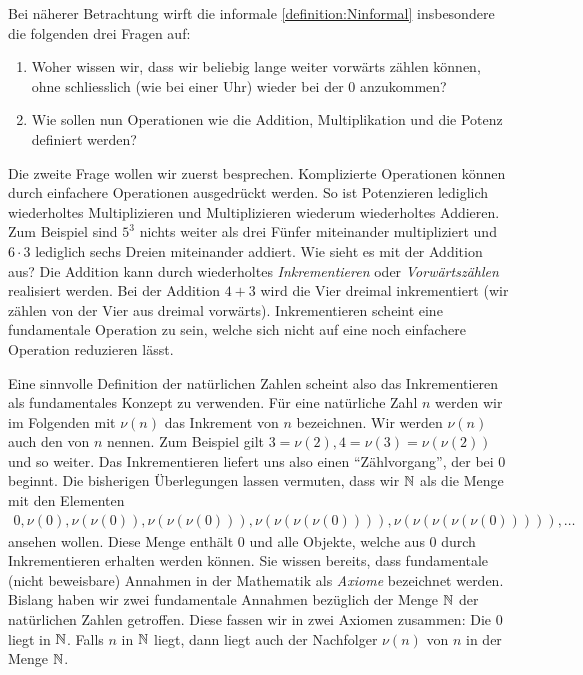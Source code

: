 Bei näherer Betrachtung wirft die informale \cref{definition:Ninformal} insbesondere die folgenden drei Fragen auf:
\begin{enumerate}
    \item Woher wissen wir, dass wir beliebig lange weiter vorwärts zählen können, ohne schliesslich (wie bei einer Uhr) wieder bei der $0$ anzukommen?
    \item Wie sollen nun Operationen wie die Addition, Multiplikation und die Potenz definiert werden?
\end{enumerate}
Die zweite Frage wollen wir zuerst besprechen. Komplizierte Operationen können durch einfachere Operationen ausgedrückt werden. So ist Potenzieren lediglich wiederholtes Multiplizieren und Multiplizieren wiederum wiederholtes Addieren. Zum Beispiel sind $5^3$ nichts weiter als drei Fünfer miteinander multipliziert und $6\cdot 3$ lediglich sechs Dreien miteinander addiert. Wie sieht es mit der Addition aus? Die Addition kann durch wiederholtes \textit{Inkrementieren} oder \textit{Vorwärtszählen} realisiert werden. Bei der Addition $4+3$ wird die Vier dreimal inkrementiert (wir zählen von der Vier aus dreimal vorwärts). Inkrementieren scheint eine fundamentale Operation zu sein, welche sich nicht auf eine noch einfachere Operation reduzieren lässt.

Eine sinnvolle Definition der natürlichen Zahlen scheint also das Inkrementieren als fundamentales Konzept zu verwenden. Für eine natürliche Zahl $n$ werden wir im Folgenden mit $\nu(n)$ das Inkrement von $n$ bezeichnen. Wir werden $\nu(n)$ auch den  von $n$ nennen. Zum Beispiel gilt $3=\nu(2), 4 = \nu(3) = \nu(\nu(2))$ und so weiter. Das Inkrementieren liefert uns also einen \enquote{Zählvorgang}, der bei 0 beginnt. Die bisherigen Überlegungen lassen vermuten, dass wir $\mathbb{N}$ als die Menge mit den Elementen
\begin{align*}
    0, \nu(0), \nu(\nu(0)), \nu(\nu(\nu(0))), \nu(\nu(\nu(\nu(0)))), \nu(\nu(\nu(\nu(\nu(0))))), \ldots
\end{align*}
ansehen wollen. Diese Menge enthält $0$ und alle Objekte, welche aus $0$ durch Inkrementieren erhalten werden können. Sie wissen bereits, dass fundamentale (nicht beweisbare) Annahmen in der Mathematik als \textit{Axiome} bezeichnet werden. Bislang haben wir zwei fundamentale Annahmen bezüglich der Menge $\mathbb{N}$ der natürlichen Zahlen getroffen. Diese fassen wir in zwei Axiomen zusammen:
{Die $0$ liegt in $\mathbb{N}$.}
{Falls $n$ in $\mathbb{N}$ liegt, dann liegt auch der Nachfolger $\nu(n)$ von $n$ in der Menge $\mathbb{N}$.}

